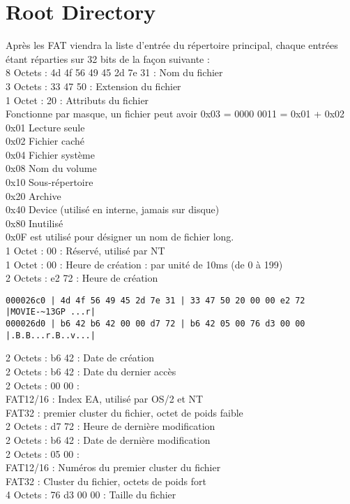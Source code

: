 \documentclass[11pt]{report}
\begin{document}
\section{Root Directory}
Après les FAT viendra la liste d'entrée du répertoire principal, chaque entrées étant réparties sur 32 bits de la façon suivante : \\
8 Octets : 4d 4f 56 49 45 2d 7e 31 : Nom du fichier\\
3 Octets : 33 47 50 : Extension du fichier\\
1 Octet : 20 : Attributs du fichier\\
Fonctionne par masque, un fichier peut avoir 0x03 = 0000 0011 = 0x01 + 0x02\\
0x01	Lecture seule\\
0x02	Fichier caché\\
0x04	Fichier système\\
0x08	Nom du volume\\
0x10	Sous-répertoire\\
0x20	Archive\\
0x40	Device (utilisé en interne, jamais sur disque)\\
0x80	Inutilisé\\
0x0F est utilisé pour désigner un nom de fichier long.\\
1 Octet : 00 : Réservé, utilisé par NT\\
1 Octet : 00 : Heure de création : par unité de 10ms (de 0 à 199)\\
2 Octets : e2 72 : Heure de création
\begin{verbatim}
000026c0 | 4d 4f 56 49 45 2d 7e 31 | 33 47 50 20 00 00 e2 72    |MOVIE-~13GP ...r|
000026d0 | b6 42 b6 42 00 00 d7 72 | b6 42 05 00 76 d3 00 00    |.B.B...r.B..v...|
\end{verbatim} 
2 Octets : b6 42 : Date de création\\
2 Octets : b6 42 : Date du dernier accès\\
2 Octets : 00 00 : \\
FAT12/16 : Index EA, utilisé par OS/2 et NT\\
FAT32 : premier cluster du fichier, octet de poids faible \\
2 Octets : d7 72 : Heure de dernière modification\\
2 Octets : b6 42 : Date de dernière modification \\
2 Octets : 05 00 : \\
FAT12/16 : Numéros du premier cluster du fichier\\
FAT32 : Cluster du fichier, octets de poids fort \\
4 Octets : 76 d3 00 00  : Taille du fichier \\
\end{document}
